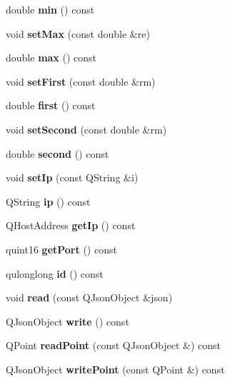 \begin{DoxyCompactItemize}
double {\bfseries min} () const
\item 
\mbox{\label{classNode_a4f72734abbd068beab2bb5efa325239d}} 
void {\bfseries set\+Max} (const double \&re)
\item 
\mbox{\label{classNode_a5e3869dd6d197f443d15aedec21653a4}} 
double {\bfseries max} () const
\item 
\mbox{\label{classNode_a95b19867e7793bd169a5338f109656b1}} 
void {\bfseries set\+First} (const double \&rm)
\item 
\mbox{\label{classNode_ada611ffb36ad9b6cadc81a8287c6d10f}} 
double {\bfseries first} () const
\item 
\mbox{\label{classNode_ae39defb336f6881f50fce60e88ce76be}} 
void {\bfseries set\+Second} (const double \&rm)
\item 
\mbox{\label{classNode_a6c71292db71aac8c9742f13583f915ad}} 
double {\bfseries second} () const
\item 
\mbox{\label{classNode_a2222f4650793659e8579c2eb725f029d}} 
void {\bfseries set\+Ip} (const Q\+String \&i)
\item 
\mbox{\label{classNode_a42fea6791a936f0255c5a8207e6a778e}} 
Q\+String {\bfseries ip} () const
\item 
\mbox{\label{classNode_a4479a7c2e0f48ed75133ca45b42ad339}} 
Q\+Host\+Address {\bfseries get\+Ip} () const
\item 
\mbox{\label{classNode_a114811570f6e6b2711635747af138e68}} 
quint16 {\bfseries get\+Port} () const
\item 
\mbox{\label{classNode_a8f3da5e81c2e206943236b3bf77589a1}} 
qulonglong {\bfseries id} () const
\item 
\mbox{\label{classNode_abcfc7dbcab27b9ffd29830b599337529}} 
void {\bfseries read} (const Q\+Json\+Object \&json)
\item 
\mbox{\label{classNode_a30c4929b3a320cdab5e4e7e60126de5c}} 
Q\+Json\+Object {\bfseries write} () const
\item 
\mbox{\label{classNode_a86f94f425dbee2eff2e43c22f5a2dc45}} 
Q\+Point {\bfseries read\+Point} (const Q\+Json\+Object \&) const
\item 
\mbox{\label{classNode_adfa903ce53347a33484770e92787fb37}} 
Q\+Json\+Object {\bfseries write\+Point} (const Q\+Point \&) const
\end{DoxyCompactItemize}
